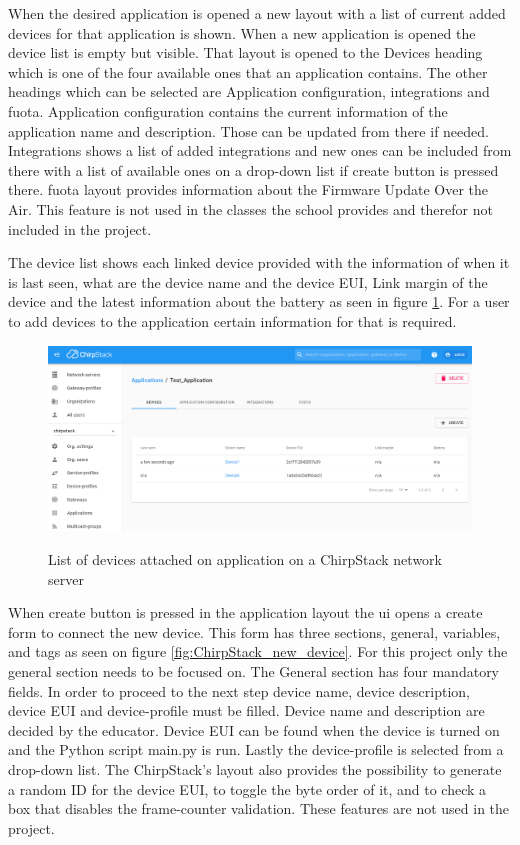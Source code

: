 When the desired application is opened a new layout with a list of current added devices for that application is shown.
When a new application is opened the device list is empty but visible.
That layout is opened to the Devices heading which is one of the four available ones that an application contains.
The other headings which can be selected are Application configuration, integrations and \gls{fuota}.
Application configuration contains the current information of the application name and description.
Those can be updated from there if needed.
Integrations shows a list of added integrations and new ones can be included from there with a list of available ones on a drop-down list if create button is pressed there.
\gls{fuota} layout provides information about the Firmware Update Over the Air.
This feature is not used in the classes the school provides and therefor not included in the project. 

The device list shows each linked device provided with the information of when it is last seen, what are the device name and the device EUI, Link margin of the device and the latest information about the battery as seen in figure \ref{fig:ChirpStack_application}.
For a user to add devices to the application certain information for that is required.

\begin{figure}[ht]
  \centering
  {\includegraphics[width=\textwidth]{illustration/ChirpStack_application.png}}
  \caption{List of devices attached on application on a ChirpStack network server}
  \label{fig:ChirpStack_application}
\end{figure}

When create button is pressed in the application layout the \gls{ui} opens a create form to connect the new device.
This form has three sections, general, variables, and tags as seen on figure \ref{fig:ChirpStack_new_device}.
For this project only the general section needs to be focused on.
The General section has four mandatory fields.
In order to proceed to the next step device name, device description, device EUI and device-profile must be filled.
Device name and description are decided by the educator.
Device EUI can be found when the device is turned on and the Python script main.py is run.
Lastly the device-profile is selected from a drop-down list.
The ChirpStack's layout also provides the possibility to generate a random ID for the device EUI, to toggle the byte order of it, and to check a box that disables the frame-counter validation.
These features are not used in the project.

